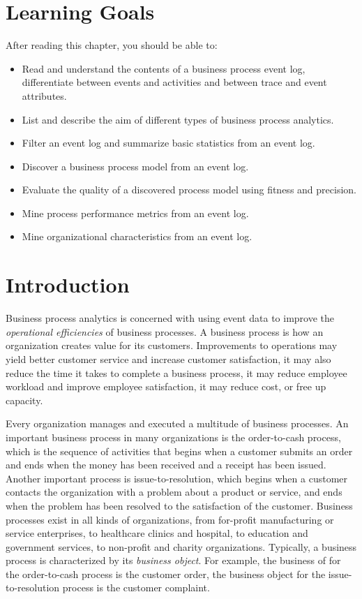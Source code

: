 %
%
\section*{Learning Goals}

After reading this chapter, you should be able to:
\begin{itemize}
   \item Read and understand the contents of a business process event log, differentiate between events and activities and between trace and event attributes.
   \item List and describe the aim of different types of business process analytics.
   \item Filter an event log and summarize basic statistics from an event log.
   \item Discover a business process model from an event log.
   \item Evaluate the quality of a discovered process model using fitness and precision.
   \item Mine process performance metrics from an event log.
   \item Mine organizational characteristics from an event log.   
\end{itemize}

\section{Introduction}

Business process analytics is concerned with using event data to improve the \emph{operational efficiencies} of business processes. A business process is how an organization creates value for its customers. Improvements to operations may yield better customer service and increase customer satisfaction, it may also reduce the time it takes to complete a business process, it may reduce employee workload and improve employee satisfaction, it may reduce cost, or free up capacity. 

Every organization manages and executed a multitude of business processes. An important business process in many organizations is the order-to-cash process, which is the sequence of activities that begins when a customer submits an order and ends when the money has been received and a receipt has been issued. Another important process is issue-to-resolution, which begins when a customer contacts the organization with a problem about a product or service, and ends when the problem has been resolved to the satisfaction of the customer. Business processes exist in all kinds of organizations, from for-profit manufacturing or service enterprises, to healthcare clinics and hospital, to education and government services, to non-profit and charity organizations. Typically, a business process is characterized by its \emph{business object}. For example, the business of for the order-to-cash process is the customer order, the business object for the issue-to-resolution process is the customer complaint.

